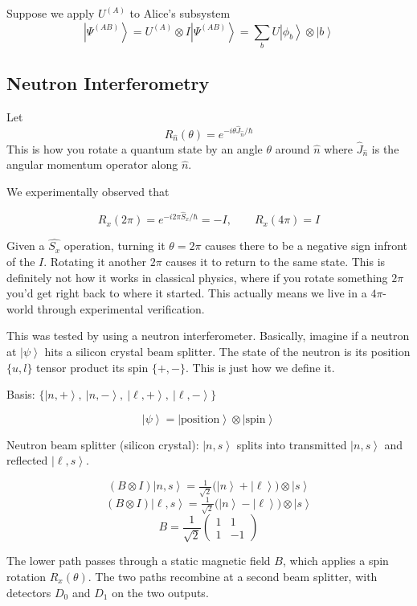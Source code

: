 \documentclass[
]{article}
\providecommand{\ket}[1]{\left\lvert #1 \right\rangle}
\begin{document}
Suppose we apply $U^{(A)}$  to Alice's subsystem
\[
	\ket{\Psi^{(AB)}} = U^{(A)} \otimes I \ket{\Psi^{(AB)}}=\sum_b U\ket{\phi_b} \otimes \ket{b}
\]
\subsection{Neutron Interferometry}\label{neutron-interferometry}

Let
\[
	R_{\hat{n}}(\theta) = e^{-i \theta \hat{J}_{\hat{n}} / \hbar}
\]
This is how you rotate a quantum state by an angle $\theta$ around $\hat{n}$ where $\hat{J}_{\hat{n}}$ is the angular momentum operator along $\hat{n}$.

We experimentally observed that

\[
	R_x(2\pi) = e^{-i 2\pi \hat{S}_x / \hbar} = -I, \qquad R_x(4\pi) = I
\]

Given a $\hat{S_x}$ operation, turning it $\theta=2\pi$ causes there to be a negative sign infront of the $I$. Rotating it another $2\pi$ causes it to return to the same state. This is definitely not how it works in classical physics, where if you rotate something $2\pi$ you'd get right back to where it started.
This actually means we live in a $4\pi$-world through experimental verification.

This was tested by using a neutron interferometer. Basically, imagine if a neutron at $\ket{\psi}$ hits a silicon crystal beam splitter. The state of the neutron is its position $\{u,l\} $ tensor product its spin $\{+, -\}$.
This is just how we define it.

Basis: $\{\ket{n,+},\ \ket{n,-},\ \ket{\ell,+},\ \ket{\ell,-}\}$

\[
	\ket{\psi} = \ket{\text{position}} \otimes \ket{\text{spin}}
\]

Neutron beam splitter (silicon crystal): $\ket{n,s}$ splits into transmitted $\ket{n,s}$ and reflected $\ket{\ell,s}$.

\[
	(B \otimes I)\ket{n,s} = \tfrac{1}{\sqrt{2}}\bigl(\ket{n} + \ket{\ell}\bigr) \otimes \ket{s}
\]
\[
	(B \otimes I)\ket{\ell,s} = \tfrac{1}{\sqrt{2}}\bigl(\ket{n} - \ket{\ell}\bigr) \otimes \ket{s}
\]
\[
	B = \frac{1}{\sqrt{2}} \begin{pmatrix} 1 & 1 \\ 1 & -1 \end{pmatrix}
\]

The lower path passes through a static magnetic field $B$, which applies a spin rotation $R_x(\theta)$. The two paths recombine at a second beam splitter, with detectors $D_0$ and $D_1$ on the two outputs.
\end{document}
